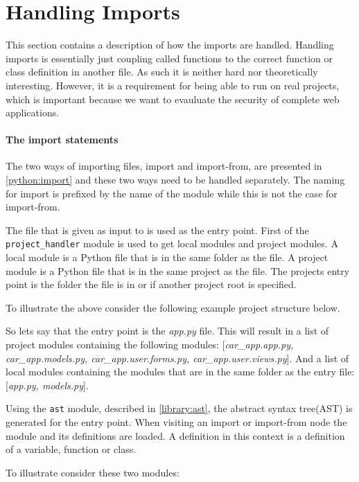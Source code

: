 \section{Handling Imports}
This section contains a description of how the imports are handled.
Handling imports is essentially just coupling called functions to the correct function or class definition in another file.
As such it is neither hard nor theoretically interesting.
However, it is a requirement for being able to run \pyt{} on real projects, which is important because we want to evauluate the security of complete web applications.

\paragraph{The import statements}
The two ways of importing files, import and import-from, are presented in \cref{python:import} and these two ways need to be handled separately.
The naming for import is prefixed by the name of the module while this is not the case for import-from.


The file that is given as input to \pyt{} is used as the entry point.
First of the \texttt{project\_handler} module is used to get local modules and project modules.
A local module is a Python file that is in the same folder as the file.
A project module is a Python file that is in the same project as the file.
The projects entry point is the folder the file is in or if another project root is specified.

To illustrate the above consider the following example project structure below.


So lets say that the entry point is the \textit{app.py} file.
This will result in a list of project modules containing the following modules: [\textit{car\_app.app.py, car\_app.models.py, car\_app.user.forms.py, car\_app.user.views.py}].
And a list of local modules containing the modules that are in the same folder as the entry file: [\textit{app.py, models.py}].


Using the \texttt{ast} module, described in \cref{library:ast}, the abstract syntax tree(AST) is generated for the entry point.
When visiting an import or import-from node the module and its definitions are loaded.
A definition in this context is a definition of a variable, function or class.

To illustrate consider these two modules:

